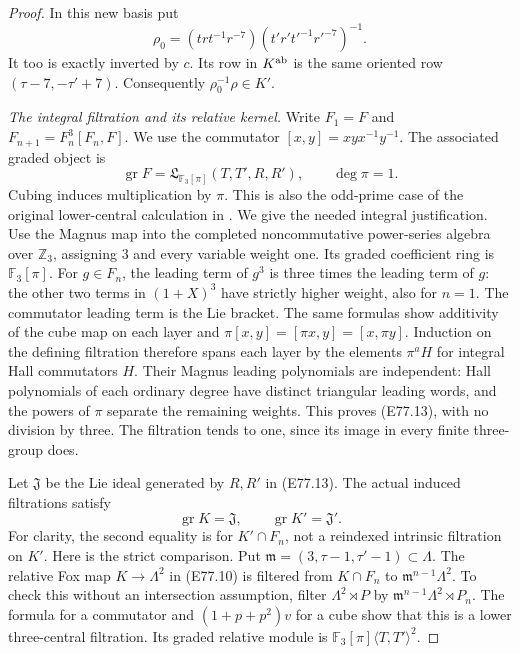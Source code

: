 \begin{proof}
In this new basis put
\[
 \rho_0=(trt^{-1}r^{-7})
              (t'r't'^{-1}r'^{-7})^{-1}.
 \tag{E77.12}
\]
It too is exactly inverted by $c$. Its row
in $K^{\rm ab}$ is the same oriented row
$(\tau-7,-\tau'+7)$. Consequently
$\rho_0^{-1}\rho\in K'$.

\emph{The integral filtration and its relative kernel.}
Write $F_1=F$ and
$F_{n+1}=F_n^3[F_n,F]$.
We use the commutator $[x,y]=xyx^{-1}y^{-1}$.
The associated graded object is
\[
 \operatorname{gr}F
   =\mathfrak L_{\mathbb F_3[\pi]}
          (T,T',R,R'),\qquad \deg\pi=1.
 \tag{E77.13}
\]
Cubing induces multiplication by $\pi$.
This is also the odd-prime case of the
original lower-central calculation in
\cite[\S2, Propositions1--2, pp.112--113]{A_Labute1967}.
We give the needed integral justification.
Use the Magnus map into the completed
noncommutative power-series algebra over
$\mathbb Z_3$, assigning $3$ and every
variable weight one. Its graded coefficient
ring is $\mathbb F_3[\pi]$.
For $g\in F_n$, the leading term of $g^3$
is three times the leading term of $g$:
the other two terms in $(1+X)^3$ have
strictly higher weight, also for $n=1$.
The commutator leading term is the Lie
bracket. The same formulas show additivity
of the cube map on each layer and
$\pi[x,y]=[\pi x,y]=[x,\pi y]$.
Induction on the defining filtration
therefore spans each layer by the elements
$\pi^a H$ for integral Hall commutators $H$.
Their Magnus leading polynomials are
independent: Hall polynomials of each
ordinary degree have distinct triangular
leading words, and the powers of $\pi$
separate the remaining weights. This
proves (E77.13), with no division by three.
The filtration tends to one, since its
image in every finite three-group does.

Let $\mathfrak J$ be the Lie ideal generated
by $R,R'$ in (E77.13). The actual induced
filtrations satisfy
\[
 \operatorname{gr}K=\mathfrak J,\qquad
 \operatorname{gr}K'=\mathfrak J'.
 \tag{E77.14}
\]
For clarity, the second equality is for
$K'\cap F_n$, not a reindexed intrinsic
filtration on $K'$.
Here is the strict comparison. Put
$\mathfrak m=(3,\tau-1,\tau'-1)\subset\Lambda$.
The relative Fox map $K\to\Lambda^2$ in
(E77.10) is filtered from $K\cap F_n$ to
$\mathfrak m^{n-1}\Lambda^2$. To check this
without an intersection assumption, filter
$\Lambda^2\rtimes P$ by
$\mathfrak m^{n-1}\Lambda^2\rtimes P_n$.
The formula for a commutator and
$(1+p+p^2)v$ for a cube show that this is
a lower three-central filtration.
Its graded relative module is
$\mathbb F_3[\pi]\langle T,T'\rangle^2$.


\end{proof}
